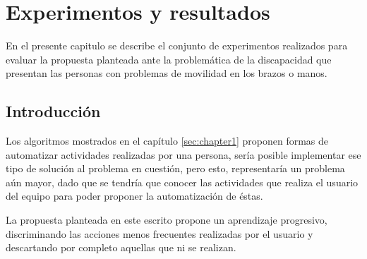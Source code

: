 \chapter{Experimentos y resultados}
\label{sec:chapter5}

En el presente capitulo se describe el conjunto de experimentos realizados para evaluar la propuesta planteada ante la problem\'atica de la discapacidad que presentan las personas con problemas de movilidad en los brazos o manos.


\section{Introducci\'on}

Los algoritmos mostrados en el cap\'itulo \ref{sec:chapter1} proponen formas de automatizar actividades realizadas por una persona, ser\'ia posible implementar ese tipo de soluci\'on al problema en cuesti\'on, pero esto, representar\'ia un problema a\'un mayor, dado que se tendr\'ia que conocer las actividades que realiza el usuario del equipo para poder proponer la automatizaci\'on de \'estas. 


La propuesta planteada en este escrito propone un aprendizaje progresivo, discriminando las acciones menos frecuentes realizadas por el usuario y descartando por completo aquellas que ni se realizan. 





\begin{comment}

\subsection{Discusi\'{o}n de resultados}


En lo referente a...\\



En general, los experimentos demostraron que el desempeno de ...\\


Resumiendo, de los resultados experimentales podemos destacar, en primer lugar, el buen desempeno que ...\\


Los resultados experimentales tambien confirman ...


\subsection{An\'{a}lisis de resultados}
En este trabajo se presento ...

 
\subsection{Discusi\'{o}n}
Las pruebas de desempeno indican que ...\\

\end{comment}